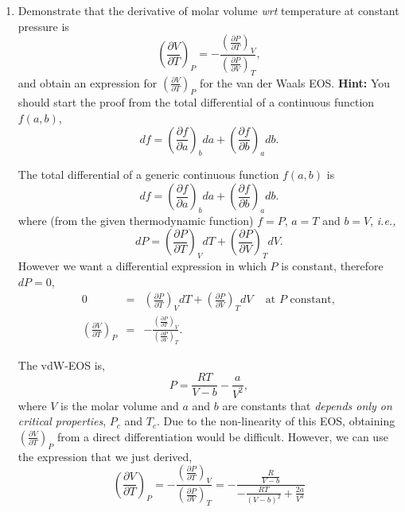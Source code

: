 \documentclass[12pts,a4paper,amsmath,amssymb,floatfix]{article}%
\newcommand{\frc}{\displaystyle\frac}
\newcommand{\ie}{{\it i.e., }}
\newcommand{\wrt}{{\it wrt }}
\newcommand{\Partial}[3][error]{\left(\frc{\partial #1}{\partial #2}\right)_{#3}}
\begin{document}
\begin{enumerate}[1)]
\begin{enumerate}[a)]
%
       \end{enumerate} 

\clearpage
\item\label{Mod03Ex02} Demonstrate that the derivative of molar volume \wrt temperature at constant pressure is
     \begin{displaymath}
         \Partial[V]{T}{P} = -\frc{\Partial[P]{T}{V}}{\Partial[P]{V}{T}},
     \end{displaymath}
     and obtain an expression for $\Partial[V]{T}{P}$ for the van der Waals EOS. {\bf Hint:} You should start the proof from the total differential of a continuous function $f(a,b)$,
     \begin{displaymath}
         df = \Partial[f]{a}{b}da + \Partial[f]{b}{a}db.
     \end{displaymath}

     The total differential of a generic continuous function $f(a,b)$ is
     \begin{displaymath}
         df = \Partial[f]{a}{b}da + \Partial[f]{b}{a}db.
     \end{displaymath}
     where (from the given thermodynamic function) $f=P$, $a=T$ and $b=V$, \ie
     \begin{displaymath}
         dP = \Partial[P]{T}{V}dT + \Partial[P]{V}{T}dV.
     \end{displaymath}
     However we want a differential expression in which $P$ is constant, therefore $dP = 0$,
     \begin{eqnarray}
         0 &=& \Partial[P]{T}{V}dT + \Partial[P]{V}{T}dV \;\;\;\text{ at } P \text{ constant},\nonumber \\
         \Partial[V]{T}{P} &=& -\frc{\Partial[P]{T}{V}}{\Partial[P]{V}{T}}.\nonumber
     \end{eqnarray}

     \medskip\noindent
     The vdW-EOS is,
     \begin{displaymath}
          P = \frc{RT}{V-b} - \frc{a}{V^{2}},
     \end{displaymath}
     where $V$ is the molar volume and $a$ and $b$ are constants that {\it depends only on critical properties}, $P_{c}$ and $T_{c}$. Due to the non-linearity of this EOS, obtaining $\Partial[V]{T}{P}$ from a direct differentiation would be difficult. However, we can use the expression that we just derived,
     \begin{displaymath}
         \Partial[V]{T}{P} = -\frc{\Partial[P]{T}{V}}{\Partial[P]{V}{T}} = -\frc{\frc{R}{V-b}}{-\frc{RT}{\left(V-b\right)^{2}}+\frc{2a}{V^{3}}}
     \end{displaymath} 


\end{enumerate}
\end{document}
